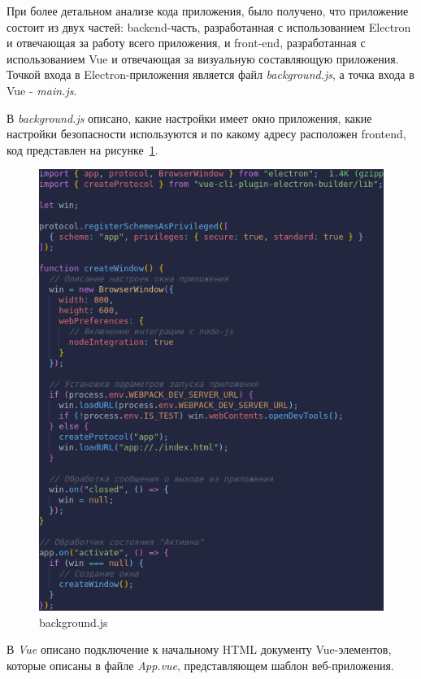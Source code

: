 При более детальном анализе кода приложения, было получено, что приложение состоит из двух частей: backend-часть, разработанная с использованием Electron и отвечающая за работу всего приложения, и front-end, разработанная с использованием Vue и отвечающая за визуальную составляющую приложения. Точкой входа в Electron-приложения является файл \emph{background.js}, а точка входа в Vue - \emph{main.js}.

В \emph{background.js} описано, какие настройки имеет окно приложения, какие настройки безопасности используются и по какому адресу расположен frontend, код представлен на рисунке~\ref{img:background_js}.


\begin{figure}[H]
  \centering
  \includegraphics[height=0.4\textheight]{assets/images/practical/background_js.png}
  \caption{background.js}
  \label{img:background_js}
\end{figure}

В \emph{Vue} описано подключение к начальному HTML документу Vue-элементов, которые описаны в файле \emph{App.vue}, представляющем шаблон веб-приложения.

